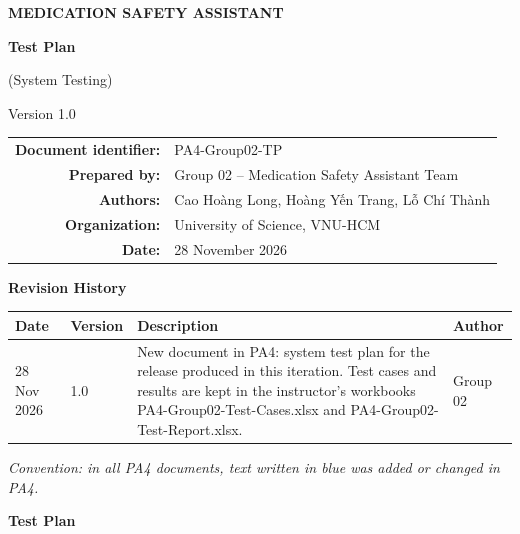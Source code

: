 \documentclass[10pt,letterpaper]{article}
\newcommand{\ProjectName}{MEDICATION SAFETY ASSISTANT}
\newcommand{\GroupName}{Medication Safety Assistant Team}
\newcommand{\GroupNumber}{Group 02}
\newcommand{\OrganizationName}{University of Science, VNU-HCM}
\newcommand{\DocumentAuthors}{Cao Hoàng Long, Hoàng Yến Trang, Lỗ Chí Thành}
\newcommand{\DocumentTitle}{Test Plan}
\newcommand{\DocumentIdentifier}{PA4-Group02-TP}
\newcommand{\DocumentVersion}{1.0}
\newcommand{\DocumentDate}{28 November 2026}
\newcommand{\upd}[1]{{\color{pafourblue}#1}}
\newcommand{\frontmattertitle}[1]{\begin{center}{\normalfont\bfseries\fontsize{16}{20}\selectfont #1\par}\end{center}}
\begin{document}
\thispagestyle{cover}
\begin{center}
  \vspace*{.35in}
  {\bfseries\fontsize{13}{17}\selectfont \ProjectName\par}
  \vspace*{1.50in}
  {\bfseries\fontsize{22}{27}\selectfont \DocumentTitle\par}
  \vspace{8pt}
  {\fontsize{12}{16}\selectfont (System Testing)\par}
  \vspace{.92in}
  {\fontsize{12}{15}\selectfont Version \DocumentVersion\par}
  \vfill
  {\fontsize{10}{14}\selectfont
    \begin{tabular}{@{}r@{\quad}l@{}}
      \textbf{Document identifier:} & \DocumentIdentifier\\
      \textbf{Prepared by:} & \GroupNumber{} -- \GroupName\\
      \textbf{Authors:} & \DocumentAuthors\\
      \textbf{Organization:} & \OrganizationName\\
      \textbf{Date:} & \DocumentDate
    \end{tabular}\par}
  \vspace*{1.05in}
\end{center}
\clearpage

\frontmattertitle{Revision History}
\vspace{7pt}
\begin{tabularx}{\textwidth}{|L{2.10cm}|L{1.30cm}|Y|L{2.60cm}|}
  \hline
  \textbf{Date} & \textbf{Version} & \textbf{Description} & \textbf{Author}\\ \hline
  \upd{28 Nov 2026} & \upd{1.0} & \upd{New document in PA4: system test plan for the release produced in this iteration. Test cases and results are kept in the instructor's workbooks PA4-Group02-Test-Cases.xlsx and PA4-Group02-Test-Report.xlsx.} & \upd{Group 02}\\ \hline
\end{tabularx}

\medskip
\upd{\textit{Convention: in all PA4 documents, text written in blue was added or changed in PA4.}}
\clearpage

\tableofcontents
\clearpage

\frontmattertitle{\DocumentTitle}
\end{document}
